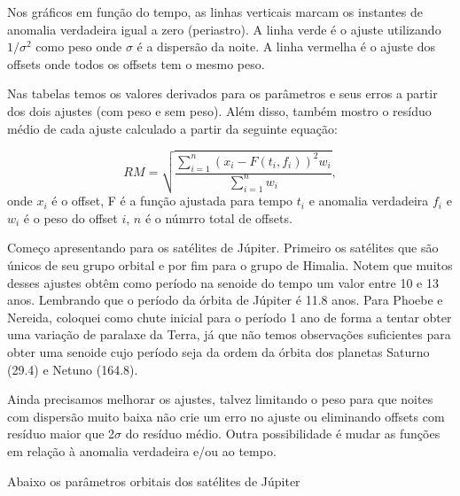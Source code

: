 \documentclass[11pt,a4paper]{report}
\begin{document}
Nos gráficos em função do tempo, as linhas verticais marcam os instantes de anomalia verdadeira igual a zero (periastro). A linha verde é o ajuste utilizando $1 / \sigma^{2}$ como peso onde $\sigma$ é a dispersão da noite. A linha vermelha é o ajuste dos offsets onde todos os offsets tem o mesmo peso.

Nas tabelas temos os valores derivados para os parâmetros e seus erros a partir dos dois ajustes (com peso e sem peso). Além disso, também mostro o resíduo médio de cada ajuste calculado a partir da seguinte equação:

\begin{equation}
RM = \sqrt{\frac{\sum\limits_{i=1}^{n}{(x_{i} - F(t_{i},f_{i}))^2}w_{i}}{\sum\limits_{i=1}^{n}{w}_{i}}},
\end{equation}
onde $x_{i}$ é o offset, F é a função ajustada para tempo $t_{i}$ e anomalia verdadeira $f_{i}$ e $w_{i}$ é o peso do offset $i$, $n$ é o númrro total de offsets.

Começo apresentando para os satélites de Júpiter. Primeiro os satélites que são únicos de seu grupo orbital e por fim para o grupo de Himalia. Notem que muitos desses ajustes obtêm como período na senoide do tempo um valor entre 10 e 13 anos. Lembrando que o período da órbita de Júpiter é 11.8 anos. Para Phoebe e Nereida, coloquei como chute inicial para o período 1 ano de forma a tentar obter uma variação de paralaxe da Terra, já que não temos observações suficientes para obter uma senoide cujo período seja da ordem da órbita dos planetas Saturno (29.4) e Netuno (164.8).

Ainda precisamos melhorar os ajustes, talvez limitando o peso para que noites com dispersão muito baixa não crie um erro no ajuste ou eliminando offsets com resíduo maior que 2$\sigma$ do resíduo médio. Outra possibilidade é mudar as funções em relação à anomalia verdadeira e/ou ao tempo.

Abaixo os par\^ametros orbitais dos sat\'elites de J\'upiter
\end{document}

